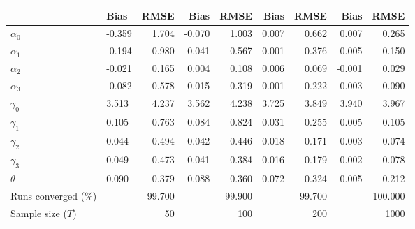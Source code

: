 
\begin{tabular}[t]{llrrrrrrr}
\toprule
  & Bias & RMSE & Bias & RMSE & Bias & RMSE & Bias & RMSE\\
\midrule
$\alpha_{0}$ & -0.359 & 1.704 & -0.070 & 1.003 & 0.007 & 0.662 & 0.007 & 0.265\\
$\alpha_{1}$ & -0.194 & 0.980 & -0.041 & 0.567 & 0.001 & 0.376 & 0.005 & 0.150\\
$\alpha_{2}$ & -0.021 & 0.165 & 0.004 & 0.108 & 0.006 & 0.069 & -0.001 & 0.029\\
$\alpha_{3}$ & -0.082 & 0.578 & -0.015 & 0.319 & 0.001 & 0.222 & 0.003 & 0.090\\
$\gamma_{0}$ & 3.513 & 4.237 & 3.562 & 4.238 & 3.725 & 3.849 & 3.940 & 3.967\\
$\gamma_{1}$ & 0.105 & 0.763 & 0.084 & 0.824 & 0.031 & 0.255 & 0.005 & 0.105\\
$\gamma_{2}$ & 0.044 & 0.494 & 0.042 & 0.446 & 0.018 & 0.171 & 0.003 & 0.074\\
$\gamma_{3}$ & 0.049 & 0.473 & 0.041 & 0.384 & 0.016 & 0.179 & 0.002 & 0.078\\
$\theta$ & 0.090 & 0.379 & 0.088 & 0.360 & 0.072 & 0.324 & 0.005 & 0.212\\
Runs converged (\%) &  & 99.700 &  & 99.900 &  & 99.700 &  & 100.000\\
Sample size ($T$) &  & 50 &  & 100 &  & 200 &  & 1000\\
\bottomrule
\end{tabular}
